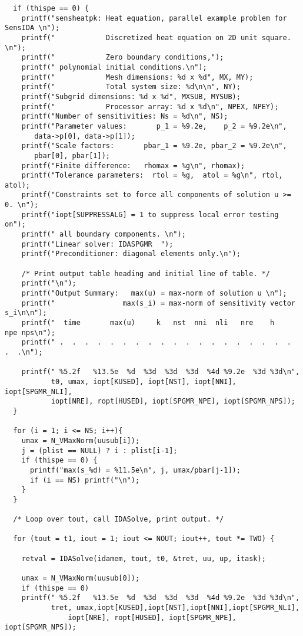 \begin{verbatim}
  if (thispe == 0) { 
    printf("sensheatpk: Heat equation, parallel example problem for SensIDA \n");
    printf("            Discretized heat equation on 2D unit square. \n");
    printf("            Zero boundary conditions,");
    printf(" polynomial initial conditions.\n");
    printf("            Mesh dimensions: %d x %d", MX, MY);
    printf("            Total system size: %d\n\n", NY);
    printf("Subgrid dimensions: %d x %d", MXSUB, MYSUB);
    printf("            Processor array: %d x %d\n", NPEX, NPEY);
    printf("Number of sensitivities: Ns = %d\n", NS);
    printf("Parameter values:       p_1 = %9.2e,    p_2 = %9.2e\n", 
	   data->p[0], data->p[1]);
    printf("Scale factors:       pbar_1 = %9.2e, pbar_2 = %9.2e\n", 
	   pbar[0], pbar[1]);
    printf("Finite difference:   rhomax = %g\n", rhomax);
    printf("Tolerance parameters:  rtol = %g,  atol = %g\n", rtol, atol);
    printf("Constraints set to force all components of solution u >= 0. \n");
    printf("iopt[SUPPRESSALG] = 1 to suppress local error testing on");
    printf(" all boundary components. \n");
    printf("Linear solver: IDASPGMR  ");
    printf("Preconditioner: diagonal elements only.\n"); 

    /* Print output table heading and initial line of table. */
    printf("\n");
    printf("Output Summary:   max(u) = max-norm of solution u \n");
    printf("                max(s_i) = max-norm of sensitivity vector s_i\n\n");
    printf("  time       max(u)     k   nst  nni  nli   nre    h       npe nps\n");
    printf(" .  .  .  .  .  .  .  .  .  .  .  .  .  .  .  .  .  .  .  .  .\n");

    printf(" %5.2f   %13.5e  %d  %3d  %3d  %3d  %4d %9.2e  %3d %3d\n",
           t0, umax, iopt[KUSED], iopt[NST], iopt[NNI], iopt[SPGMR_NLI], 
           iopt[NRE], ropt[HUSED], iopt[SPGMR_NPE], iopt[SPGMR_NPS]);
  }

  for (i = 1; i <= NS; i++){
    umax = N_VMaxNorm(uusub[i]);
    j = (plist == NULL) ? i : plist[i-1];
    if (thispe == 0) {
      printf("max(s_%d) = %11.5e\n", j, umax/pbar[j-1]);
      if (i == NS) printf("\n");
    }
  }

  /* Loop over tout, call IDASolve, print output. */

  for (tout = t1, iout = 1; iout <= NOUT; iout++, tout *= TWO) {

    retval = IDASolve(idamem, tout, t0, &tret, uu, up, itask);

    umax = N_VMaxNorm(uusub[0]);
    if (thispe == 0) 
	printf(" %5.2f   %13.5e  %d  %3d  %3d  %3d  %4d %9.2e  %3d %3d\n",
 	       tret, umax,iopt[KUSED],iopt[NST],iopt[NNI],iopt[SPGMR_NLI], 
               iopt[NRE], ropt[HUSED], iopt[SPGMR_NPE], iopt[SPGMR_NPS]);


\end{verbatim}
